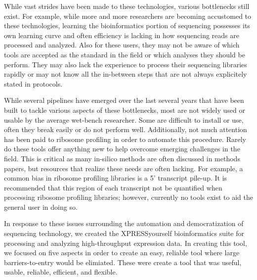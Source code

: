\documentclass[11pt, a4paper, oneside]{article}
\begin{document}
While vast strides have been made to these technologies, various bottlenecks still exist. For example, while more and more researchers are becoming accustomed to these technologies, learning the bioinformatics portion of sequencing possesses its own learning curve and often efficiency is lacking in how sequencing reads are processed and analyzed. Also for these users, they may not be aware of which tools are accepted as the standard in the field or which analyses they should be perform. They may also lack the experience to process their sequencing libraries rapidly or may not know all the in-between steps that are not always explicitely stated in protocols.

While several pipelines have emerged over the last several years that have been built to tackle various aspects of these bottlenecks, most are not widely used or usable by the average wet-bench researcher. Some are difficult to install or use, often they break easily or do not perform well. Additionally, not much attention has been paid to ribosome profiling in order to automate this procedure. Rarely do these tools offer anything new to help overcome emerging challenges in the field. This is critical as many in-silico methods are often discussed in methods papers, but resources that realize these needs are often lacking. For example, a common bias in ribosome profiling libraries is a 5' transcript pile-up. It is recommended that this region of each transcript not be quantified when processing ribosome profiling libraries; however, currently no tools exist to aid the general user in doing so.

In response to these issues surrounding the automation and democratization of sequencing technology, we created the XPRESSyourself bioinformatics suite for processing and analyzing high-throughput expression data. In creating this tool, we focused on five aspects in order to create an easy, reliable tool where large barriers-to-entry would be elimiated. These were create a tool that was useful, usable, reliable, efficient, and flexible.
\end{document}
